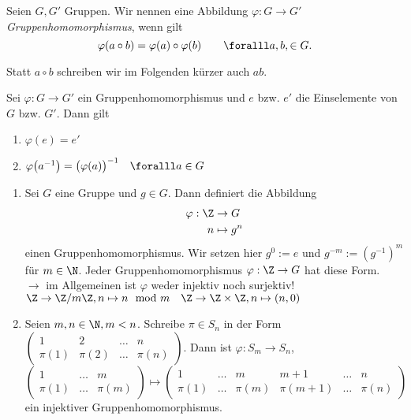 \lecture

\begin{defn*}[Gruppenhomomorphismus] 
	Seien $ G,G' $ Gruppen. Wir nennen eine Abbildung $ \varphi: G \to G' $ \emph{Gruppenhomomorphismus}, wenn gilt
	\[ \varphi (a \circ b) = \varphi(a) \circ \varphi(b) \qquad \foralll a,b, \in G. \]
\end{defn*}

\begin{rem*}
	Statt $a \circ b$ schreiben wir im Folgenden kürzer auch $ab$.
\end{rem*}

\begin{lem}
	Sei $\varphi: G \to G'$ ein Gruppenhomomorphismus und $e$ bzw. $e'$ die Einselemente von $G$ bzw. $G'$. Dann gilt
	\begin{enumerate}[label=({\roman*})]
		\item $\varphi(e) = e'$
		\item $ \varphi\big(a^{-1}\big) = \big(\varphi(a)\big)^{-1} \quad \foralll a \in G $
	\end{enumerate}
\end{lem}

\begin{exmp*}
	\begin{enumerate}[label=\textcircled{\alph*}]
		\item Sei $G$ eine Gruppe und $g \in G$. Dann definiert die Abbildung
			\begin{align*}
				\varphi: \Z &\to G\\
				n &\mapsto g^n
			\end{align*}
			einen Gruppenhomomorphismus. Wir setzen hier $g^0 := e$ und $g^{-m}:= (g^{-1})^m$ für $m \in \N$. Jeder Gruppenhomomorphismus $\varphi: \Z \to G$ hat diese Form.\\
			$\to$ im Allgemeinen ist $\varphi$ weder injektiv noch surjektiv!\\
			$ \Z \to \Z/m\Z, n \mapsto n \mod m \quad \Z \to \Z \times \Z, n \mapsto (n,0) $
		
		\item Seien $m,n \in \N, m < n$. Schreibe $\pi \in S_n$ in der Form $ \begin{pmatrix}
				1 & 2 & \dots & n \\ \pi(1) & \pi(2) & \dots & \pi(n)
			\end{pmatrix} $. Dann ist $ \varphi: S_m \to S_n$, $$\begin{pmatrix}
				1 & \dots & m \\ \pi(1) & \dots & \pi(m)
			\end{pmatrix} \mapsto \begin{pmatrix}
				1 & \dots & m & m+1 & \dots & n \\ \pi(1) & \dots & \pi(m) & \pi(m+1) & \dots & \pi(n)
			\end{pmatrix} $$ ein injektiver Gruppenhomomorphismus.
	\end{enumerate}
\end{exmp*}

